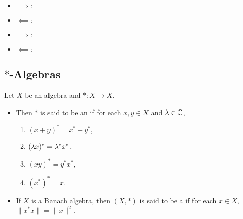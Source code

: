\documentclass{book}
\begin{document}
	
	
	
	
	
	
	\begin{itemize}
		\item $\implies:$ \\
		\item $\impliedby:$ \\
	\end{itemize}
	
	\begin{itemize}
		\item $\implies:$ \\
		
		\item $\impliedby:$ \\
		
	\end{itemize}
	














































	\newpage
	\subsection{$*$-Algebras}

	\begin{defn}
		Let $X$ be an algebra and $*: X \rightarrow X$. 
		\begin{itemize}
			\item Then $*$ is said to be an  if 
			for each $x, y \in X$ and $\lambda \in \mathbb{C}$, 
			\begin{enumerate}
				\item $(x + y)^* = x^* + y^*$, 
				\item $(\lambda x)^* = \lambda^* x^*$, 
				\item $(xy)^* = y^*x^*$, 
				\item $(x^*)^* = x$.
			\end{enumerate}
			\item If $X$ is a Banach algebra, then $(X, *)$ is said to be a  if for each $x \in X$, $\|x^*x\| = \|x\|^2$.
		\end{itemize}
	\end{defn}
\end{document}
